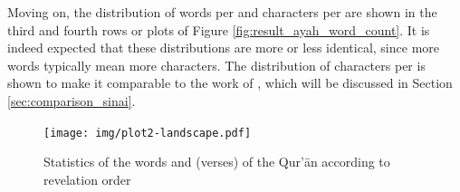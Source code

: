 Moving on, the distribution of words per   and characters per   are shown in the third and fourth rows or plots of Figure \ref{fig:result_ayah_word_count}. It is indeed expected that these distributions are more or less identical, since more words typically mean more characters. The distribution of characters per   is shown to make it comparable to the work of , which will be discussed in Section \ref{sec:comparison_sinai}.

\begin{landscape}
    \begin{figure}[!h]
        \centering
        \texttt{[image: img/plot2-landscape.pdf]}
        \caption{Statistics of the words and   (verses) of the Qur'\=an according to revelation order}
        \label{fig:result_ayah_word_count_rev_order}
    \end{figure}    
\end{landscape}

